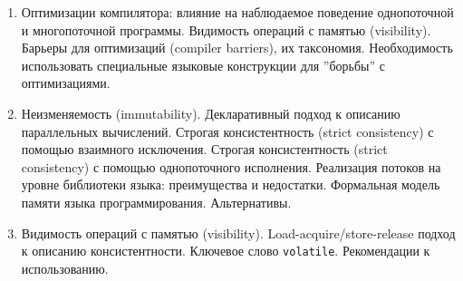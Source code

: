 \documentclass[a4paper, 12pt]{extarticle}
\begin{document}
\begin{enumerate}[\thesection .1]
	\item Оптимизации компилятора: влияние на наблюдаемое поведение однопоточной и многопоточной программы. Видимость операций с памятью (visibility).
	Барьеры для оптимизаций (compiler barriers), их таксономия. Необходимость использовать специальные языковые конструкции для ''борьбы'' с оптимизациями.
	
	\item \langMM 

	Неизменяемость (immutability). Декларативный подход к описанию параллельных вычислений.
	Строгая консистентность (strict consistency) с помощью взаимного исключения.
	Строгая консистентность (strict consistency) с помощью однопоточного исполнения.
	Реализация потоков на уровне библиотеки языка: преимущества и недостатки.
	Формальная модель памяти языка программирования. Альтернативы.
	
	\item \langMM 
	
	Видимость операций с памятью (visibility). Load-acquire/store-release подход к описанию консистентности. Ключевое слово \texttt{volatile}. Рекомендации к использованию.

\end{enumerate}
\end{document}
